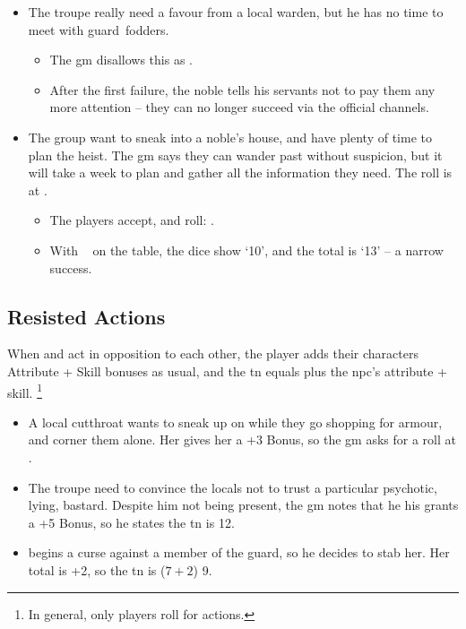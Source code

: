 \begin{multicols}{2}
\begin{exampletext}
\begin{itemize}
  \item
    The troupe really need a favour from a local \gls{warden}, but he has no time to meet with \gls{guard}~\glspl{fodder}.
  \begin{itemize}
    \item
    The \gls{gm} disallows this as .
    \item
    After the first failure, the noble tells his servants not to pay them any more attention -- they can no longer succeed via the official channels.
  \end{itemize}
  \item
  The group want to sneak into a noble's house, and have plenty of time to plan the heist.
  The \gls{gm} says they can wander past without suspicion, but it will take a week to plan and gather all the information they need.
  The roll is  at \tn[12].
    \begin{itemize}
    \item
    The players accept, and roll: .
    \item
    With ~ on the table, the dice show `10', and the total is `13' -- a narrow success.
    \end{itemize}
\end{itemize}
\end{exampletext}

\subsection{Resisted Actions}
\label{resistedactions}

When  and  act in opposition to each other, the player adds their characters Attribute + Skill bonuses as usual, and the \gls{tn} equals \tn[7] plus the \gls{npc}'s \gls{attribute} + \gls{skill}.%
\footnote{In general, only players roll for actions.}

\begin{exampletext}
  \begin{itemize}
    \item
      A local cutthroat wants to sneak up on  while they go shopping for armour, and corner them alone.
      Her  gives her a +3 Bonus, so the \gls{gm} asks for a  roll at \tn[10].
    \item
      The troupe need to convince the locals not to trust a particular psychotic, lying, bastard.
      Despite him not being present, the \gls{gm} notes that he his  grants a +5 Bonus, so he states the \gls{tn} is 12.
    \item
     begins a curse against a member of the \gls{guard}, so he decides to stab her.
    Her  total is +2, so the \gls{tn} is ($7+2$) 9.


\end{itemize}
\end{exampletext}
\end{multicols}

